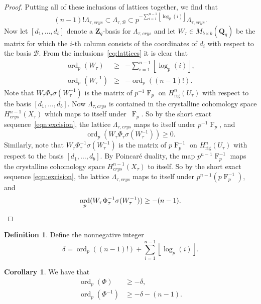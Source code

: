 \documentclass[a4paper,11pt]{article}
\numberwithin{equation}{section}
\providecommand{\floor}[1]{\left\lfloor#1\right\rfloor}   %
\newcommand{\ZZ}{\mathbf{Z}} %
\newcommand{\QQ}{\mathbf{Q}} %
\DeclareMathOperator{\ord}{ord}          %
\DeclareMathOperator{\Frob}{F}           %
\providecommand{\Hrig}{H_{\text{rig}}}  %
\providecommand{\cB}{\mathcal{B}} %
\theoremstyle{definition}
\newtheorem{cor}[thm]{Corollary}
\newtheorem{defn}[thm]{Definition}
\begin{document}
\begin{proof}
Putting all of these inclusions of lattices together, we find that
\begin{equation} \label{eq:lattices}
(n-1)! \Lambda_{\tau,crys} \subset \Lambda_{\tau,\cB} \subset p^{-\sum_{i=1}^{n-1} \floor{\log_p(i)}} \Lambda_{\tau,crys}.
\end{equation}
Now let $[d_1, \dotsc, d_b]$ denote a $\ZZ_q$-basis for $\Lambda_{\tau,crys}$ and 
let $W_{\tau} \in M_{b \times b}(\QQ_q)$ be the matrix for which the $i$-th column 
consists of the coordinates of $d_i$ with respect to the basis $\cB$. From the 
inclusions~\eqref{eq:lattices} it is clear that 
\begin{eqnarray*}
\ord_p(W_{\tau}) &\geq& -\sum_{i=1}^{n-1} \floor{\log_p(i)}, \\
\ord_p(W_{\tau}^{-1}) &\geq& -\ord_p((n-1)!).
\end{eqnarray*}
Note that $W_{\tau} \Phi_{\tau} \sigma(W_{\tau}^{-1})$ is the matrix of 
$p^{-1}\Frob_{p}$ on $\Hrig^n(U_{\tau})$ with respect to the basis 
$[d_1,\dotsc,d_b]$. Now $\Lambda_{\tau,crys}$ is contained in the crystalline 
cohomology space $H^{n-1}_{crys}(X_{\tau})$ which maps to itself 
under~$\Frob_p$. So by the short exact sequence~\eqref{eqn:excision}, the 
lattice $\Lambda_{\tau,crys}$ maps to itself under $p^{-1}\Frob_{p}$, and
\[
\ord_p(W_{\tau} \Phi_{\tau} \sigma(W_{\tau}^{-1})) \geq 0.
\]
Similarly, note that $W_{\tau} \Phi_{\tau}^{-1} \sigma(W_{\tau}^{-1})$ is 
the matrix of $p\Frob_p^{-1}$ on $\Hrig^n(U_{\tau})$ with respect to the 
basis $[d_1,\dotsc,d_b]$. By Poincar\'e duality, the map $p^{n-1}\Frob_p^{-1}$ 
maps the crystalline cohomology space $H^{n-1}_{crys}(X_{\tau})$ to itself. 
So by the short exact sequence \eqref{eqn:excision}, the lattice 
$\Lambda_{\tau,crys}$ maps to itself under $p^{n-1} (p\Frob_p^{-1})$, and 
\begin{equation*}
\ord_p(W_{\tau} \Phi_{\tau}^{-1} \sigma(W_{\tau}^{-1})) \geq -(n-1). \qedhere
\end{equation*}
\end{proof}

\begin{defn} \label{defn:delta}
Define the nonnegative integer
\[
\delta = \ord_p((n-1)!)+\sum_{i=1}^{n-1} \floor{\log_p(i)}.
\]
\end{defn}

\begin{cor} \label{cor:delta} We have that
\begin{align*}
\ord_p(\Phi) &\geq -\delta, \\
\ord_p(\Phi^{-1}) &\geq -\delta-(n-1).
\end{align*}
\end{cor}
\end{document}
